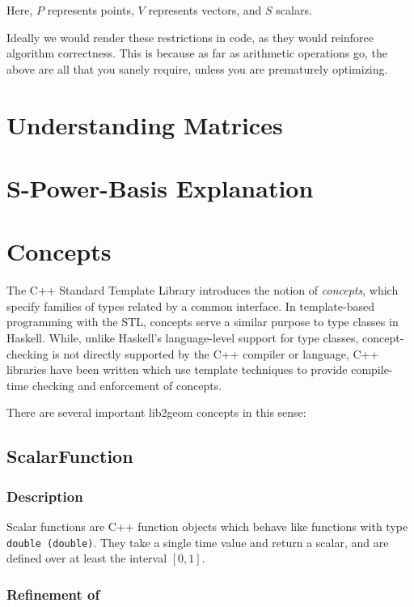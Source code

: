 \documentclass[openany]{book}
\begin{document}
Here, $P$ represents points, $V$ represents vectors, and $S$ scalars.

Ideally we would render these restrictions in code, as they would
reinforce algorithm correctness.  This is because as far as arithmetic
operations go, the above are all that you sanely require, unless you
are prematurely optimizing.

\section{Understanding Matrices}

\section{S-Power-Basis Explanation}

\section{Concepts}

The C++ Standard Template Library\cite{stl} introduces the notion of
\emph{concepts}\cite{stl_concepts}, which specify families of types related
by a common interface.  In template-based programming with the STL, concepts
serve a similar purpose to type classes in Haskell.  While, unlike Haskell's
language-level support for type classes, concept-checking is not directly
supported by the C++ compiler or language, C++ libraries have been written
which use template techniques to provide compile-time checking and enforcement
of concepts\cite{boost_concept_check}.

There are several important lib2geom concepts in this sense:

\subsection{ScalarFunction}

\subsubsection{Description}

Scalar functions are C++ function objects which behave like functions
with type {\tt double (double)}.  They take a single time value and return
a scalar, and are defined over at least the interval $[0, 1]$.

\subsubsection{Refinement of}
\end{document}
